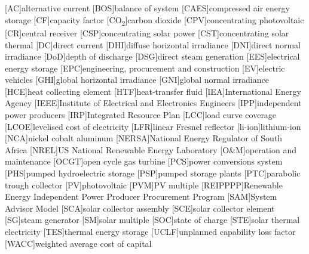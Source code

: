 {}
\chapter*{\listacroname}
\begin{acronym}[XXXXX]
  	[AC]{alternative current}
  	[BOS]{balance of system}
  	[CAES]{compressed air energy storage}
  	[CF]{capacity factor}
  	[CO\textsubscript{2}]{carbon dioxide}
    [CPV]{concentrating photovoltaic}
    [CR]{central receiver}
    [CSP]{concentrating solar power}
    [CST]{concentrating solar thermal} 
    [DC]{direct current}
    [DHI]{diffuse horizontal irradiance}
    [DNI]{direct normal irradiance}
	[DoD]{depth of discharge}
    [DSG]{direct steam generation}
    [EES]{electrical energy storage}
    [EPC]{engineering, procurement and construction}
    [EV]{electric vehicles}
    [GHI]{global horizontal irradiance}
    [GNI]{global normal irradiance}
    [HCE]{heat collecting element}
    [HTF]{heat-transfer fluid} 
    [IEA]{International Energy Agency}
    [IEEE]{Institute of Electrical and Electronics Engineers}
    [IPP]{independent power producers}
    [IRP]{Integrated Resource Plan}
    [LCC]{load curve coverage}
    [LCOE]{levelised cost of electricity}
    [LFR]{linear Fresnel reflector}
    [li-ion]{lithium-ion}  
    [NCA]{nickel cobalt aluminum}
    [NERSA]{National Energy Regulator of South Africa}
    [NREL]{US National Renewable Energy Laboratory}
    [O\&M]{operation and maintenance}
    [OCGT]{open cycle gas turbine}
    [PCS]{power conversions system}
    [PHS]{pumped hydroelectric storage}
    [PSP]{pumped storage plants}
    [PTC]{parabolic trough collector}
    [PV]{photovoltaic}
    [PVM]{PV multiple}
    [REIPPPP]{Renewable Energy Independent Power Producer Procurement Program}
    [SAM]{System Advisor Model}
    [SCA]{solar collector assembly}
    [SCE]{solar collector element}
    [SG]{steam generator}
    [SM]{solar multiple}
    [SOC]{state of charge}
    [STE]{solar thermal electricity}
    [TES]{thermal energy storage}
    [UCLF]{unplanned capability loss factor}
    [WACC]{weighted average cost of capital}
\end{acronym}
